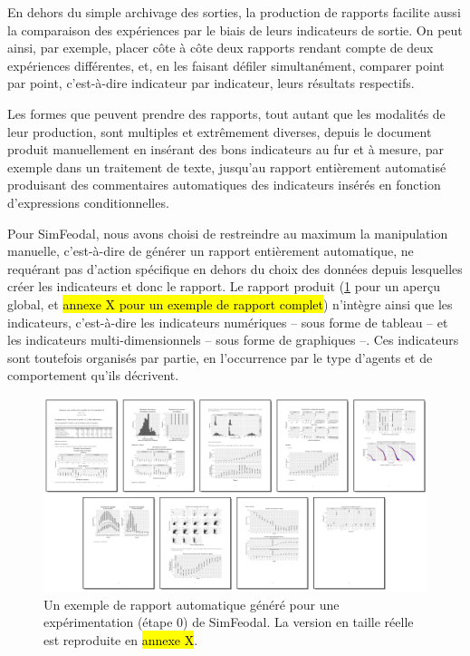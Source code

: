 	En dehors du simple archivage des sorties, la production de rapports facilite aussi la comparaison des expériences par le biais de leurs indicateurs de sortie.
	On peut ainsi, par exemple, placer côte à côte deux rapports rendant compte de deux expériences différentes, et, en les faisant défiler simultanément, comparer point par point, c'est-à-dire indicateur par indicateur, leurs résultats respectifs.

	Les formes que peuvent prendre des rapports, tout autant que les modalités de leur production, sont multiples et extrêmement diverses, depuis le document produit manuellement en insérant des bons indicateurs au fur et à mesure, par exemple dans un traitement de texte, jusqu'au rapport entièrement automatisé produisant des commentaires automatiques des indicateurs insérés en fonction d'expressions conditionnelles.

	Pour SimFeodal, nous avons choisi de restreindre au maximum la manipulation manuelle, c'est-à-dire de générer un rapport entièrement automatique, ne requérant pas d'action spécifique en dehors du choix des données depuis lesquelles créer les indicateurs et donc le rapport.
	Le rapport produit (\cref{fig:simfeodal_rapport_mini} pour un aperçu global, et \hl{annexe X pour un exemple de rapport complet}) n'intègre ainsi que les indicateurs, c'est-à-dire les indicateurs numériques -- sous forme de tableau -- et les indicateurs multi-dimensionnels -- sous forme de graphiques --.
	Ces indicateurs sont toutefois organisés par partie, en l'occurrence par le type d'agents et de comportement qu'ils décrivent. 
	
	\begin{figure}[H]
		\captionsetup{width=\linewidth}
		\includegraphics[width=\linewidth]{img/SimFeodal_Rapport_exemple.png}
		\caption{Un exemple de rapport automatique généré pour une expérimentation (étape 0) de SimFeodal. La version en taille réelle est reproduite en \hl{annexe X}.} 
		\label{fig:simfeodal_rapport_mini} 
	\end{figure}
	
